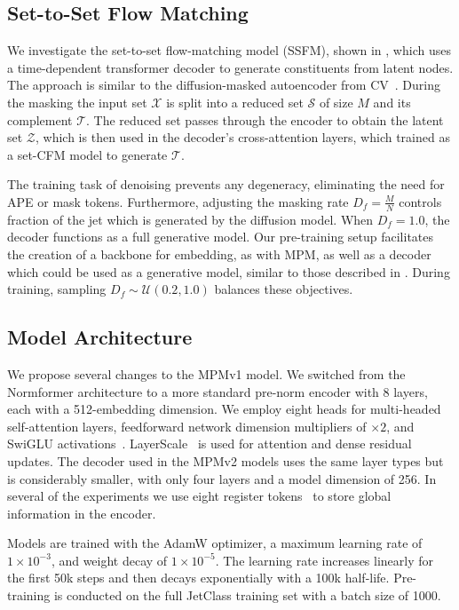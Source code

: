 \subsection{Set-to-Set Flow Matching}

We investigate the set-to-set flow-matching model (SSFM), shown in , which uses a time-dependent transformer decoder to generate constituents from latent nodes.
The approach is similar to the diffusion-masked autoencoder from CV~\cite{diffmae}.
During the masking the input set $\mathcal{X}$ is split into a reduced set $\mathcal{S}$ of size $M$ and its complement $\mathcal{T}$.
The reduced set passes through the encoder to obtain the latent set $\mathcal{Z}$, which is then used in the decoder's cross-attention layers, which trained as a set-CFM model to generate $\mathcal{T}$.

The training task of denoising prevents any degeneracy, eliminating the need for APE or mask tokens.
Furthermore, adjusting the masking rate $D_f = \frac{M}{N}$ controls fraction of the jet which is generated by the diffusion model.
When $D_f=1.0$, the decoder functions as a full generative model.
Our pre-training setup facilitates the creation of a backbone for embedding, as with MPM, as well as a decoder which could be used as a generative model, similar to those described in .
During training, sampling $D_f \sim \mathcal{U}(0.2, 1.0)$ balances these objectives.

\subsection{Model Architecture}

We propose several changes to the MPMv1 model.
We switched from the Normformer architecture to a more standard pre-norm encoder with 8 layers, each with a 512-embedding dimension.
We employ eight heads for multi-headed self-attention layers, feedforward network dimension multipliers of $\times2$, and SwiGLU activations~\cite{SwiGLU}.
LayerScale~\cite{GoingDeeper} is used for attention and dense residual updates.
The decoder used in the MPMv2 models uses the same layer types but is considerably smaller, with only four layers and a model dimension of 256.
In several of the experiments we use eight register tokens~\cite{VisionTransformersNeed} to store global information in the encoder.

Models are trained with the AdamW optimizer, a maximum learning rate of $1 \times 10^{-3}$, and weight decay of $1 \times 10^{-5}$.
The learning rate increases linearly for the first 50k steps and then decays exponentially with a 100k half-life.
Pre-training is conducted on the full JetClass training set with a batch size of 1000.

